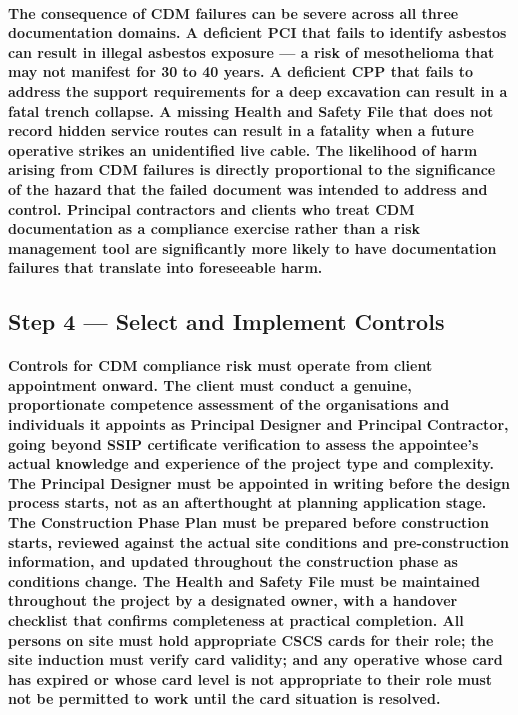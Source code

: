 \paragraph{The consequence of CDM failures can be severe across all three documentation domains. A deficient PCI that fails to identify asbestos can result in illegal asbestos exposure --- a risk of mesothelioma that may not manifest for 30 to 40 years. A deficient CPP that fails to address the support requirements for a deep excavation can result in a fatal trench collapse. A missing Health and Safety File that does not record hidden service routes can result in a fatality when a future operative strikes an unidentified live cable. The likelihood of harm arising from CDM failures is directly proportional to the significance of the hazard that the failed document was intended to address and control. Principal contractors and clients who treat CDM documentation as a compliance exercise rather than a risk management tool are significantly more likely to have documentation failures that translate into foreseeable harm.}

\subsection{Step 4 --- Select and Implement Controls}
\paragraph{Controls for CDM compliance risk must operate from client appointment onward. The client must conduct a genuine, proportionate competence assessment of the organisations and individuals it appoints as Principal Designer and Principal Contractor, going beyond SSIP certificate verification to assess the appointee's actual knowledge and experience of the project type and complexity. The Principal Designer must be appointed in writing before the design process starts, not as an afterthought at planning application stage. The Construction Phase Plan must be prepared before construction starts, reviewed against the actual site conditions and pre-construction information, and updated throughout the construction phase as conditions change. The Health and Safety File must be maintained throughout the project by a designated owner, with a handover checklist that confirms completeness at practical completion. All persons on site must hold appropriate CSCS cards for their role; the site induction must verify card validity; and any operative whose card has expired or whose card level is not appropriate to their role must not be permitted to work until the card situation is resolved.}

